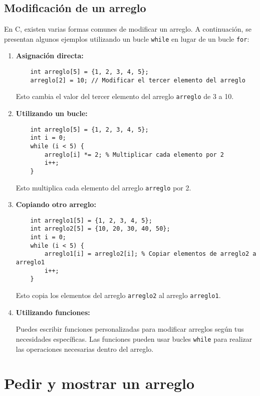 \documentclass{article}
\begin{document}
\subsection{Modificación de un arreglo}

En C, existen varias formas comunes de modificar un arreglo. A continuación, se presentan algunos ejemplos utilizando un bucle \texttt{while} en lugar de un bucle \texttt{for}:

\begin{enumerate}
    \item \textbf{Asignación directa:}
    \begin{verbatim}
    int arreglo[5] = {1, 2, 3, 4, 5};
    arreglo[2] = 10; // Modificar el tercer elemento del arreglo        
    \end{verbatim}
    Esto cambia el valor del tercer elemento del arreglo \texttt{arreglo} de 3 a 10.
    
    \item \textbf{Utilizando un bucle:}
    \begin{verbatim}
    int arreglo[5] = {1, 2, 3, 4, 5};
    int i = 0;
    while (i < 5) {
        arreglo[i] *= 2; % Multiplicar cada elemento por 2
        i++;
    }
    \end{verbatim}
    Esto multiplica cada elemento del arreglo \texttt{arreglo} por 2.
    
    \item \textbf{Copiando otro arreglo:}
    \begin{verbatim}
    int arreglo1[5] = {1, 2, 3, 4, 5};
    int arreglo2[5] = {10, 20, 30, 40, 50};
    int i = 0;
    while (i < 5) {
        arreglo1[i] = arreglo2[i]; % Copiar elementos de arreglo2 a arreglo1
        i++;
    }
    \end{verbatim}
    Esto copia los elementos del arreglo \texttt{arreglo2} al arreglo \texttt{arreglo1}.
    
    \item \textbf{Utilizando funciones:}
    
    Puedes escribir funciones personalizadas para modificar arreglos según tus necesidades específicas. Las funciones pueden usar bucles \texttt{while} para realizar las operaciones necesarias dentro del arreglo.
\end{enumerate}

\section{Pedir y mostrar un arreglo}
\end{document}
